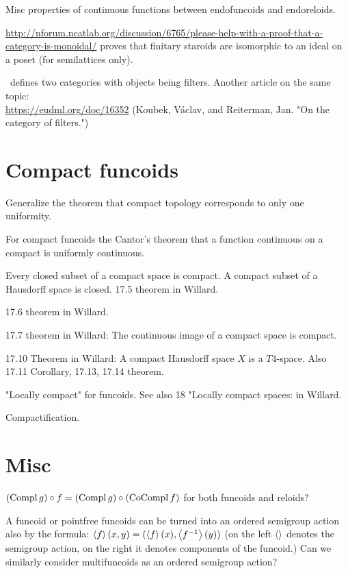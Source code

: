 \documentclass{amsart}
\begin{document}
Misc properties of continuous functions between endofuncoids and endoreloids.

\url{http://nforum.ncatlab.org/discussion/6765/please-help-with-a-proof-that-a-category-is-monoidal/} proves that
finitary staroids are isomorphic to an ideal on a poset (for semilattices only).

\cite{filt-cat}~defines two categories with objects being filters. Another article on the same topic:\\
\url{https://eudml.org/doc/16352} (Koubek, V\'aclav, and Reiterman, Jan. "On the category of filters.")


\section{Compact funcoids}

Generalize the theorem that compact topology corresponds to only one uniformity.

For compact funcoids the Cantor's theorem that a function continuous on a compact is uniformly continuous.

Every closed subset of a compact space is compact. A compact subset of a Hausdorff space is closed. 17.5 theorem in Willard.

17.6 theorem in Willard.

17.7 theorem in Willard: The continuous image of a compact space is compact.

17.10 Theorem in Willard: A compact Hausdorff space $X$ is a $T 4$-space. Also 17.11 Corollary, 17.13, 17.14 theorem.

"Locally compact" for funcoids. See also 18 "Locally compact spaces: in Willard.

Compactification.

\section{Misc}

$(\operatorname{Compl} g)\circ f=(\operatorname{Compl} g)\circ(\operatorname{CoCompl} f)$ for both funcoids and reloids?

A funcoid or pointfree funcoids can be turned into an ordered semigroup action also by the formula: $\left\langle f\right\rangle(x,y)=(\left\langle f\right\rangle(x),\left\langle f^{-1}\right\rangle(y))$ (on the left $\left\langle \right\rangle$ denotes the semigroup action, on the right it denotes components of the funcoid.) Can we similarly consider multifuncoids as an ordered semigroup action?
\end{document}
